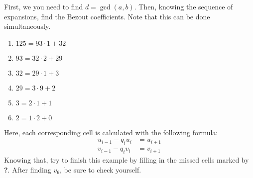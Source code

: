 \documentclass[../lecture-notes-148x210.tex]{subfiles}
\begin{document}
\begin{example} 
    \hfill

    First, we you need to find $d = \gcd(a,b)$. Then, knowing the sequence of
    expansions, find the Bezout coefficients. Note that this can be done
    simultaneously.

    \hfill

    \begin{minipage}{0.35\textwidth}
        \raggedright
        \vspace*{\fill}
            \begin{enumerate}
                \item $125 = 93 \cdot 1 + 32$
                \item $93 = 32 \cdot 2 + 29$
                \item $32 = 29 \cdot 1 + 3$
                \item $29 = 3 \cdot 9 + 2$
                \item $3 = 2 \cdot 1 + 1$
                \item $2 = 1 \cdot 2 + 0$        
            \end{enumerate}
        \vspace*{\fill}
    \end{minipage}
    \begin{minipage}{0.75\textwidth}
    \end{minipage}

    \hfill
    
    Here, each corresponding cell is calculated with the following formula: 
    \begin{align*}
        u_{i-1} - q_i u_i &= u_{i+1} \\
        v_{i-1} - q_i v_i &= v_{i+1} 
    \end{align*}
    Knowing that, try to finish this example by filling in the missed cells
    marked by \textcolor{green!60!black}{\textbf{?}}. After finding $v_6$, be
    sure to check yourself.
\end{example}
\end{document}
